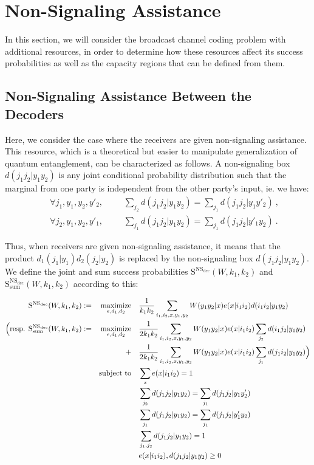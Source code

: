 \section{Non-Signaling Assistance}
\label{section:NSBC}
In this section, we will consider the broadcast channel coding problem with additional resources, in order to determine how these resources affect its success probabilities as well as the capacity regions that can be defined from them.

\subsection{Non-Signaling Assistance Between the Decoders}
Here, we consider the case where the receivers are given non-signaling assistance. This resource, which is a theoretical but easier to manipulate generalization of quantum entanglement, can be characterized as follows.  A non-signaling box $d(j_1j_2|y_1y_2)$ is any joint conditional probability distribution such that the marginal from one party is independent from the other party's input, ie. we have:
\begin{equation}
  \begin{aligned}
    &&\forall j_1,y_1,y_2,y'_2, &&&\sum_{j_2} d(j_1j_2|y_1y_2) = \sum_{j_1} d(j_1j_2|y_1y'_2) \ ,\\
    &&\forall j_2,y_1,y_2,y'_1, &&&\sum_{j_1} d(j_1j_2|y_1y_2) = \sum_{j_1} d(j_1j_2|y'_1y_2) \ .
  \end{aligned}
\end{equation}

Thus, when receivers are given non-signaling assistance, it means that the product $d_1(j_1|y_1)d_2(j_2|y_2)$ is replaced by the non-signaling box $d(j_1j_2|y_1y_2)$. We define the joint and sum success probabilities $\mathrm{S}^{\mathrm{NS}_{\text{dec}}}(W,k_1,k_2)$ and $\mathrm{S}_{\text{sum}}^{\mathrm{NS}_{\text{dec}}}(W,k_1,k_2)$ according to this:

\begin{equation}
  \begin{aligned}
    \mathrm{S}^{\mathrm{NS}_{\text{dec}}}(W,k_1,k_2) := &&\underset{e,d_1,d_2}{\operatorname{\text{maximize}}} &&& \frac{1}{k_1k_2}\sum_{i_1,i_2,x,y_1,y_2} W(y_1y_2|x)e(x|i_1i_2)d(i_1i_2|y_1y_2)\\
    \Big(\text{resp. }\mathrm{S}_{\text{sum}}^{\mathrm{NS}_{\text{dec}}}(W,k_1,k_2) := &&\underset{e,d_1,d_2}{\operatorname{\text{maximize}}} &&& \frac{1}{2k_1k_2}\sum_{i_1,i_2,x,y_1,y_2} W(y_1y_2|x)e(x|i_1i_2)\sum_{j_2}d(i_1j_2|y_1y_2)\\
    &&+&&& \frac{1}{2k_1k_2}\sum_{i_1,i_2,x,y_1,y_2} W(y_1y_2|x)e(x|i_1i_2)\sum_{j_1}d(j_1i_2|y_1y_2)\Big)\\
    &&\operatorname{\text{subject to}} &&& \sum_x e(x|i_1i_2) = 1\\
    &&&&& \sum_{j_2} d(j_1j_2|y_1y_2) = \sum_{j_1} d(j_1j_2|y_1y'_2)\\
    &&&&& \sum_{j_1} d(j_1j_2|y_1y_2) = \sum_{j_1} d(j_1j_2|y'_1y_2)\\
    &&&&& \sum_{j_1,j_2} d(j_1j_2|y_1y_2) = 1\\
    &&&&& e(x|i_1i_2), d(j_1j_2|y_1y_2) \geq 0\\
  \end{aligned}
\end{equation}

